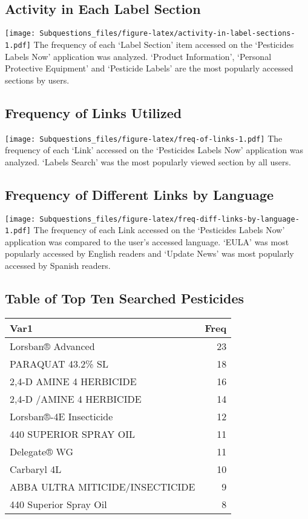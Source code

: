 \documentclass[
]{article}
\begin{document}
\hypertarget{activity-in-each-label-section}{%
\subsection{Activity in Each Label
Section}\label{activity-in-each-label-section}}

\texttt{[image: Subquestions\_files/figure-latex/activity-in-label-sections-1.pdf]}
The frequency of each `Label Section' item accessed on the `Pesticides
Labels Now' application was analyzed. `Product Information', `Personal
Protective Equipment' and `Pesticide Labels' are the most popularly
accessed sections by users.

\hypertarget{frequency-of-links-utilized}{%
\subsection{Frequency of Links
Utilized}\label{frequency-of-links-utilized}}

\texttt{[image: Subquestions\_files/figure-latex/freq-of-links-1.pdf]}
The frequency of each `Link' accessed on the `Pesticides Labels Now'
application was analyzed. `Labels Search' was the most popularly viewed
section by all users.

\hypertarget{frequency-of-different-links-by-language}{%
\subsection{Frequency of Different Links by
Language}\label{frequency-of-different-links-by-language}}

\texttt{[image: Subquestions\_files/figure-latex/freq-diff-links-by-language-1.pdf]}
The frequency of each Link accessed on the `Pesticides Labels Now'
application was compared to the user's accessed language. `EULA' was
most popularly accessed by English readers and `Update News' was most
popularly accessed by Spanish readers.

\hypertarget{table-of-top-ten-searched-pesticides}{%
\subsection{Table of Top Ten Searched
Pesticides}\label{table-of-top-ten-searched-pesticides}}

\begin{tabular}{l|r}
\hline
Var1 & Freq\\
\hline
Lorsban® Advanced & 23\\
\hline
PARAQUAT 43.2\% SL & 18\\
\hline
2,4-D AMINE 4 HERBICIDE & 16\\
\hline
2,4-D /AMINE 4 HERBICIDE & 14\\
\hline
Lorsban®-4E Insecticide & 12\\
\hline
440 SUPERIOR SPRAY OIL & 11\\
\hline
Delegate® WG & 11\\
\hline
Carbaryl 4L & 10\\
\hline
ABBA ULTRA MITICIDE/INSECTICIDE & 9\\
\hline
440 Superior Spray Oil & 8\\
\hline
\end{tabular}
\end{document}

